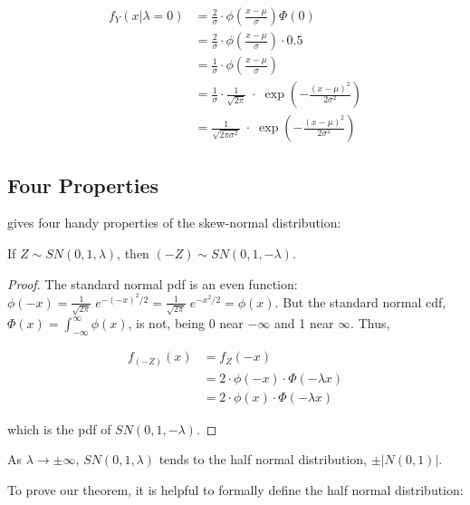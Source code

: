 \documentclass{article}
\begin{document}
\begin{align*}
  f_Y(x|\lambda=0) &= \frac2\sigma \cdot \phi \left( \frac{x-\mu}{\sigma} \right) \Phi(0) \\
  &= \frac2\sigma \cdot \phi \left( \frac{x-\mu}{\sigma} \right) \cdot 0.5 \\
  &= \frac1\sigma \cdot \phi \left( \frac{x-\mu}{\sigma} \right) \\
  &= \frac1\sigma \cdot \frac{1}{\sqrt{2\pi}} \;\cdot\; \exp \left( -\frac{(x-\mu)^2}{2\sigma^2} \right) \\
  &= \frac{1}{\sqrt{2\pi\sigma^2}} \;\cdot\; \exp \left( -\frac{(x-\mu)^2}{2\sigma^2} \right)
\end{align*}

\subsection{Four Properties}
\label{subsec:four-properties}

\citet{main} gives four handy properties of the skew-normal distribution:

\begin{property} \label{prop:1}
  If $Z \sim SN(0, 1, \lambda)$, then $(-Z) \sim SN(0, 1, -\lambda)$.
\end{property}

\begin{proof}
  The standard normal pdf is an even function: $\phi(-x) =
  \frac{1}{\sqrt{2\pi}}\;e^{-(-x)^2/2} = \frac{1}{\sqrt{2\pi}}\;e^{-x^2/2} =
  \phi(x)$. But the standard normal cdf, \thinspace $\Phi(x) =
  \int_{-\infty}^\infty \phi(x)$, \thinspace is not, being 0 near $-\infty$ and
  1 near $\infty$. Thus,
  
  \begin{align*}
    f_{(-Z)}(x) &= f_Z(-x) \\
    & = 2 \cdot \phi(-x) \cdot \Phi (-\lambda x) \\
    & = 2 \cdot \phi(x) \cdot \Phi (-\lambda x)
  \end{align*}

  which is the pdf of $SN(0, 1, -\lambda)$.
\end{proof}

\begin{property} \label{prop:2}
  As $\lambda \to \pm \infty$, \thinspace $SN(0,1,\lambda)$ tends to the half normal distribution, $\pm |N(0,1)|$.
\end{property}

To prove our theorem, it is helpful to formally define the half normal distribution:
\end{document}
